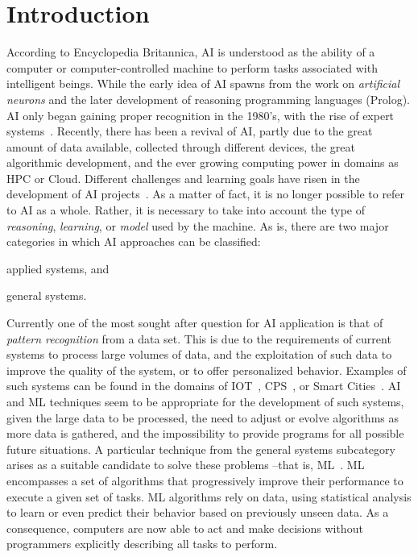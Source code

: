 
\section{Introduction}
\label{sec:introduction}

According to Encyclopedia Britannica, \ac{AI} is understood as the ability of a computer or 
computer-controlled machine to perform tasks associated with intelligent beings. While the early 
idea of \ac{AI} spawns from the work on \textit{artificial neurons} and the later development of
reasoning programming languages (\eg Prolog). \ac{AI} only began gaining proper recognition 
in the 1980's, with the rise of expert systems~\cite{russel09}.  Recently, there has been a revival of 
\ac{AI}, partly due to the great amount of data available, collected through different devices, the 
great algorithmic development, and the ever growing computing power in domains as \ac{HPC} or 
Cloud. Different challenges and learning goals have risen in the development of \ac{AI} 
projects~\cite{russel09}. As a matter of fact, it is no longer possible to refer to \ac{AI} as a whole. 
Rather, it is necessary to take into account the type of \emph{reasoning}, \emph{learning}, or 
\emph{model} used by the machine. As is, there are two major categories in which \ac{AI} 
approaches can be classified:
\begin{enumerate*}[label=(\arabic*)]
\item applied systems, and
\item general systems.
\end{enumerate*}

Currently one of the most sought after question for \ac{AI} application is that of \emph{pattern 
recognition} from a data set. This is due to the requirements of current systems to process large 
volumes of data, and the exploitation of such data to improve the quality of the system, or to offer 
personalized behavior. Examples of such systems can be found in the domains of 
\ac{IOT}~\cite{mattern10}, \acs{CPS}~\cite{holzl15}, or Smart Cities~\cite{zanella14}. \ac{AI} and 
\ac{ML} techniques seem to be appropriate for the development of such systems, given the large 
data to be processed, the need to adjust or evolve algorithms as more data is gathered, and the 
impossibility to provide programs for all possible future situations. 
A particular technique from the general systems subcategory arises 
as a suitable candidate to solve these problems --that is, \ac{ML}~\cite{mitchell97}. 
\ac{ML} encompasses a set of algorithms that progressively improve their performance to execute 
a given set of tasks. \ac{ML} algorithms rely on data, using statistical analysis to learn or even predict 
their behavior based on previously unseen data. As a consequence, computers are now able to act 
and make decisions without programmers explicitly describing all tasks to perform.


